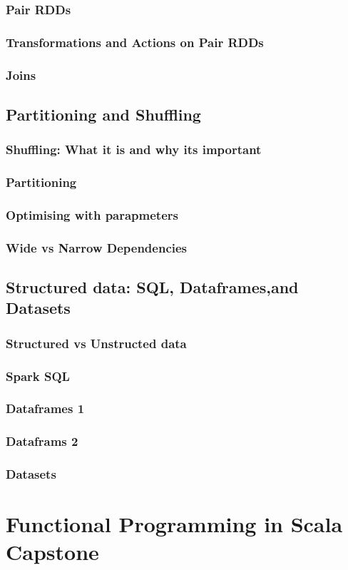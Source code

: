 \documentclass[10pt, a4paper]{report}
\begin{document}
\section{Pair RDDs}
\section{Transformations and Actions on Pair RDDs}
\section{Joins}

\chapter{Partitioning and Shuffling}

\section{Shuffling: What it is and why its important}
\section{Partitioning}
\section{Optimising with parapmeters}
\section{Wide vs Narrow Dependencies}

\chapter{Structured data: SQL, Dataframes,and Datasets}

\section{Structured vs Unstructed data}
\section{Spark SQL}
\section{Dataframes 1}
\section{Dataframs 2}
\section{Datasets}

\part{Functional Programming in Scala Capstone}
\end{document}
